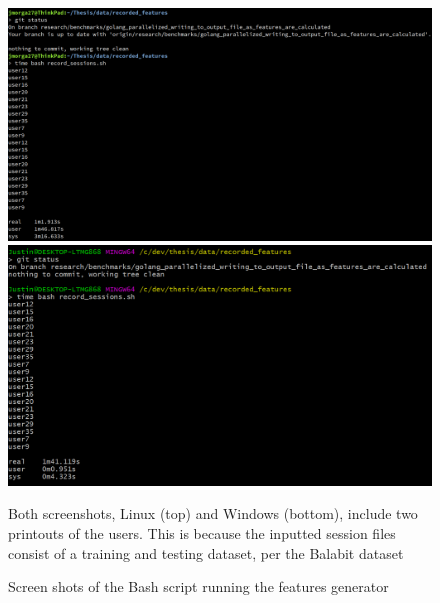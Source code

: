 \begin{figure}
    \centering
    \includegraphics[width=1\columnwidth]{figures/bash_feature_generator_runtime_screenshot_linux}
    \includegraphics[width=1\columnwidth]{figures/bash_feature_generator_runtime_screenshot_windows}
    \caption{Screen shots of the Bash script running the features generator}
    {\small Both screenshots, Linux (top) and Windows (bottom), include two printouts of the users. This is because the inputted session files consist of a training and testing dataset, per the Balabit dataset~\cite{balabit_dataset}}
    \label{fig:bash-features-generator-runtimes}
\end{figure}

